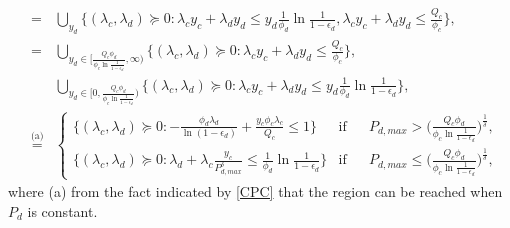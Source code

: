 \documentclass[12pt, draftclsnofoot, journal, letterpaper, onecolumn]{IEEEtran}
\begin{document}
\begin{IEEEproof}
\begin{eqnarray*}
& {=}&\bigcup_{y_d}\big\{(\lambda_c,\lambda_d)\succeq0:\lambda_cy_c+\lambda_dy_d \leq y_d\frac{1}{\phi_d}\ln\frac{1}{1-\epsilon_d},\lambda_cy_c+\lambda_dy_d \leq \frac{Q_c}{\phi_c}\big\},\\
&=&\bigcup_{y_d\in[\frac{Q_c\phi_d}{\phi_c\ln\frac{1}{1-\epsilon_d}},\infty)}\big\{(\lambda_c,\lambda_d)\succeq0:\lambda_cy_c+\lambda_dy_d \leq \frac{Q_c}{\phi_c}\big\},\\
&&\bigcup_{y_d\in[0,\frac{Q_c\phi_d}{\phi_c\ln\frac{1}{1-\epsilon_d}})}\big\{(\lambda_c,\lambda_d)\succeq0:\lambda_cy_c+\lambda_dy_d \leq y_d\frac{1}{\phi_d}\ln\frac{1}{1-\epsilon_d}\big\},\\
& \overset{\text{(a)}}{=} &
\begin{cases}
\big\{(\lambda_c,\lambda_d)\succeq0:-\frac{\phi_d\lambda_d}{\ln(1-\epsilon_d)}+\frac{y_c\phi_c\lambda_c}{Q_c} \leq 1\big\} & \mbox{if} \phantom{aaa} P_{d,max}>\bigg(\frac{Q_c\phi_d}{\phi_c\ln\frac{1}{1-\epsilon_d}}\bigg)^{\frac{1}{\delta}},\\
\big\{(\lambda_c,\lambda_d)\succeq0:\lambda_d+\lambda_c\frac{y_c}{P_{d,max}^\delta} \leq \frac{1}{\phi_d}\ln\frac{1}{1-\epsilon_d}\big\} & \mbox{if}\phantom{aaa} P_{d,max}\leq\bigg(\frac{Q_c\phi_d}{\phi_c\ln\frac{1}{1-\epsilon_d}}\bigg)^{\frac{1}{\delta}},
\end{cases}
\end{eqnarray*}
where (a) from the fact indicated by \eqref{CPC} that the region can be reached when $P_d$ is constant.
\end{IEEEproof}
\end{document}
